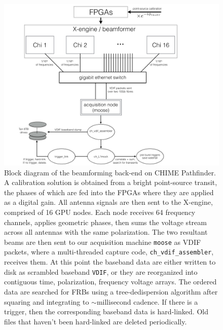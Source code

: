 \begin{figure}[!h]
\label{fig-bf_diagram}
\begin{center}
\vspace{-0.5in}
\includegraphics[trim={1.in, 0in, 2.5in, 0in}, width=1\textwidth]{./figures/beamforming/moose_diagram.png} 
\caption[abc]{Block diagram of the beamforming back-end on CHIME Pathfinder. 
     A calibration solution is obtained from a bright point-source transit, 
     the phases of which are fed into the FPGAs where they are applied as a 
     digital gain. All antenna signals are then sent to the X-engine, 
     comprised of 16 GPU nodes. Each node receives 64 frequency channels,
     applies geometric phases, then 
     sums the voltage stream across all antennas with the same polarization. 
     The two resultant beams are then sent to our acquisition machine {\tt moose} 
     as VDIF packets, where a multi-threaded capture code, {\tt ch\_vdif\_assembler},
     receives them. 
     At this point the baseband data are either written to disk as scrambled baseband 
     {\tt VDIF}, or they are reorganized into contiguous time, 
     polarization, frequency voltage arrays. The ordered data are 
     searched for FRBs using a tree-dedispersion algorithm
     after squaring and integrating to $\sim$millisecond cadence. 
     If there is a trigger, then the corresponding 
     baseband data is hard-linked. Old files that haven't been hard-linked are deleted
     periodically.}
\end{center}
\end{figure}

